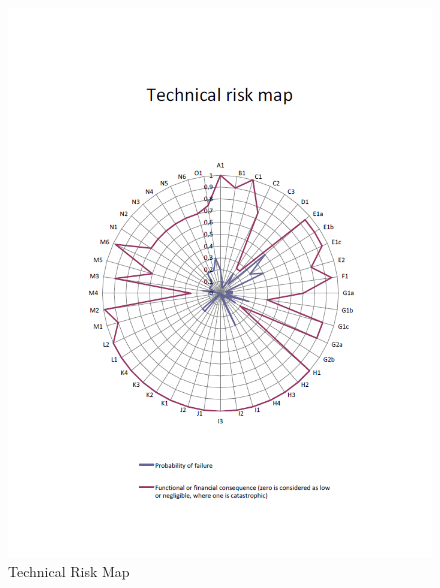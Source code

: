 \documentclass[11pt]{report}
\begin{document}
\begin{enumerate}[A]
\begin{figure} [h]
	\begin{center}
 \includegraphics[trim = 0mm 0mm 0mm 35mm, clip,width=1.0\textwidth,angle=0]{img/TRA_RM.png}	
	\caption{Technical Risk Map}
	\label{TRA_RM}
	\end{center}
\end{figure}

\end{enumerate}
\end{document}
